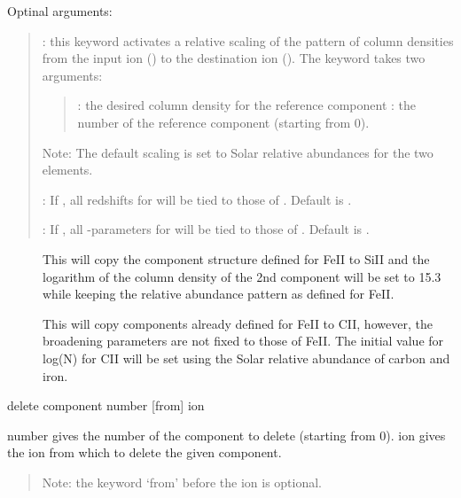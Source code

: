\documentclass[letterpaper,10pt,english]{sphinxmanual}
\begin{document}
Optinal arguments:
\begin{quote}

 : this keyword activates a relative scaling of the pattern of column densities
from the input ion () to the destination ion ().
The keyword takes two arguments:
\begin{quote}

 : the desired column density for the reference component
 : the number of the reference component (starting from 0).
\end{quote}

Note: The default scaling is set to Solar relative abundances for the two elements.

 : If , all redshifts for  will be tied to those of .
Default is .

 : If , all -parameters for  will be tied to those of .
Default is .
\end{quote}

\begin{sphinxShadowBox}
\begin{description}
\item[{}] \leavevmode
This will copy the component structure defined for FeII to SiII
and the logarithm of the column density of the 2nd component will be set to 15.3
while keeping the relative abundance pattern as defined for FeII.

\item[{}] \leavevmode
This will copy components already defined for FeII to CII,
however, the broadening parameters are not fixed to those of FeII.
The initial value for log(N) for CII will be set using the Solar
relative abundance of carbon and iron.

\end{description}
\end{sphinxShadowBox}

delete component  number  {[}from{]} ion

number  gives the number of the component to delete (starting from 0).
ion             gives the ion from which to delete the given component.
\begin{quote}

Note: the keyword ‘from’ before the ion is optional.
\end{quote}
\end{document}
